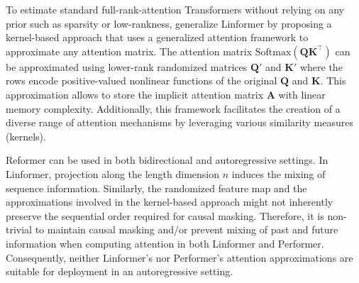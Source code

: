 


To estimate standard full-rank-attention Transformers without relying on any prior such as sparsity or low-rankness, \citet{choromanski2020rethinking} generalize Linformer by proposing a kernel-based approach that uses a generalized attention framework to approximate any attention matrix. The attention matrix $\text{Softmax}(\bm{Q}\bm{K}^{\top})$ can be approximated using lower-rank randomized matrices $\bm{Q'}$ and $\bm{K'}$ where the rows encode positive-valued nonlinear functions of the original $\bm{Q}$ and $\bm{K}$. This approximation allows to store the implicit attention matrix $\bm{A}$ with linear memory complexity. Additionally, this framework facilitates the creation of a diverse range of attention mechanisms by leveraging various similarity measures (kernels). 


Reformer can be used in both bidirectional and autoregressive settings. In Linformer, projection along the length dimension $n$ induces the mixing of sequence information. Similarly, the randomized feature map and the approximations involved in the kernel-based approach might not inherently preserve the sequential order required for causal masking. Therefore, it is non-trivial to maintain causal masking and/or prevent mixing of past and future information when computing attention in both Linformer and Performer. Consequently, neither Linformer's nor Performer's attention approximations are suitable for deployment in an autoregressive setting.

